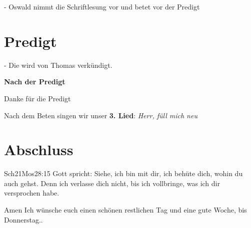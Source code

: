 \documentclass[12pt,a4paper]{scrarticle}
\begin{document}
- Oswald nimmt die Schriftlesung vor und betet vor der Predigt

\section{Predigt}
- Die wird von Thomas verkündigt.

\textbf{Nach der Predigt}

Danke für die Predigt

Nach dem Beten singen wir unser \textbf{3. Lied}: \textit{Herr, füll mich neu}\\

\section{Abschluss}

\begin{bibeltext}{Sch2}{1Mos}{28:15}
Gott spricht: Siehe, ich bin mit dir,
ich behüte dich, wohin du auch gehst.
Denn ich verlasse dich nicht,
bis ich vollbringe, was ich dir versprochen habe.
\end{bibeltext}
Amen
Ich wünsche euch einen schönen restlichen Tag und eine gute Woche, bis Donnerstag..
\end{document}
